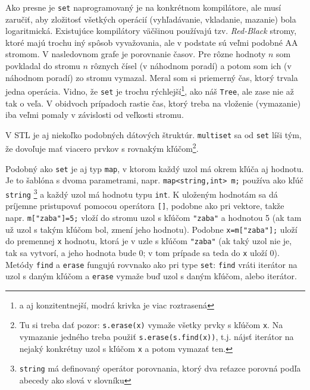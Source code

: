 \documentclass[10pt]{article}
\def\prg{\lstinline}
\def\ods{\vspace*{10pt}}
\begin{document}
{\ods
Ako presne je \prg!set! naprogramovaný je na konkrétnom kompilátore, ale musí zaručiť,
aby zložitosť všetkých operácií (vyhľadávanie, vkladanie, mazanie) bola logaritmická.
Existujúce kompilátory väčšinou používajú
tzv. {\em Red-Black} stromy, ktoré majú trochu iný spôsob vyvažovania, ale v podstate
sú veľmi podobné AA stromom. 
V nasledovnom grafe je porovnanie časov. Pre rôzne hodnoty $n$ som
povkladal do stromu $n$ rôznych čísel (v náhodnom poradí) a potom som ich (v náhodnom poradí)
zo stromu vymazal. Meral som si priemerný čas, ktorý trvala jedna operácia. Vidno, že
\prg!set! je trochu rýchlejší\footnote{a aj konzitentnejší, modrá krivka je viac roztrasená}, 
ako náš {\tt Tree}, ale zase nie až tak o veľa. V obidvoch
prípadoch rastie čas, ktorý treba na vloženie (vymazanie) iba veľmi pomaly 
v závislosti od veľkosti stromu.


\ods
{}

\ods


\ods
V STL je aj niekoľko podobných dátových štruktúr. \prg!multiset! sa od \prg!set!
líši tým,
že dovoľuje mať viacero prvkov s rovnakým kľúčom\footnote{%
  Tu si treba dať pozor: \prg!s.erase(x)! vymaže všetky prvky s kľúčom \prg!x!.
  Na vymazanie jedného treba použiť \prg!s.erase(s.find(x))!, t.j. nájsť iterátor 
  na nejaký konkrétny uzol s kľúčom {\tt x} a potom vymazať ten.}. 

\ods
  Podobný ako \prg!set! je aj typ \prg!map!, v ktorom každý uzol 
  má okrem kľúča aj hodnotu. Je to šablóna s dvoma parametrami, 
  napr. \prg!map<string,int> m;! používa ako kľúč
  \prg!string! \footnote{\prg!string! má definovaný operátor porovnania, ktorý dva reťazce
  porovná podľa abecedy ako slová v slovníku} a každý uzol má hodnotu typu \prg!int!.
  K uloženým hodnotám sa dá príjemne pristupovať pomocou operátora \prg![]!, podobne
  ako pri vektore, takže napr. \prg!m["zaba"]=5;! vloží do stromu uzol s kľúčom
  \prg!"zaba"! a hodnotou 5 (ak tam už uzol s takým kľúčom bol, zmení jeho hodnotu).
  Podobne \prg!x=m["zaba"];! uloží do premennej \prg!x! hodnotu, ktorá je v uzle
  s kľúčom \prg!"zaba"! (ak taký uzol nie je, tak sa vytvorí, a jeho hodnota bude 0;
  v tom prípade sa teda do \prg!x! uloží 0). 
  Metódy \prg!find! a \prg!erase! fungujú rovvnako ako
  pri type \prg!set!: \prg!find! vráti iterátor na uzol s daným kľúčom a
  \prg!erase! vymaže buď uzol s daným kľúčom, alebo iterátor. 

}
\end{document}
